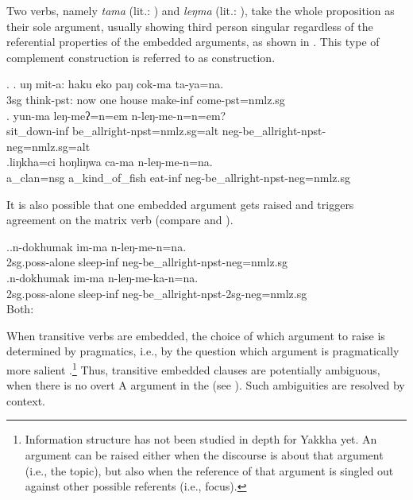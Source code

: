 Two verbs, namely \emph{tama}  (lit.: ) and \emph{leŋma}  (lit.: ), take the whole proposition as their sole argument, usually showing third person singular  regardless of the referential properties of the embedded arguments, as shown in \Next. This type of complement construction is referred to as  construction.

\ex. \ag. uŋ mit-a:       haku eko paŋ  cok-ma    ta-ya=na.\\
	{\sc 3sg} think{\sc [3sg]-pst}: now one house make-{\sc inf} come{\sc [3sg]-pst=nmlz.sg}\\
	 
 	\bg. yun-ma leŋ-meʔ=n=em n-leŋ-me-n=n=em?\\
	sit\_down{\sc -inf} be\_allright{\sc [3sg]-npst=nmlz.sg=alt} {\sc neg-}be\_allright{\sc [3sg]-npst-neg=nmlz.sg=alt}\\
	\bg.liŋkha=ci hoŋliŋwa ca-ma n-leŋ-me-n=na.\\
	a\_clan{\sc =nsg} a\_kind\_of\_fish eat{\sc -inf}	{\sc neg-}be\_allright{\sc [3sg]-npst-neg=nmlz.sg}\\ 

It is also possible that one embedded argument gets raised and triggers agreement on the matrix verb (compare \Next[a] and \Next[b]). 

\ex.\ag.n-dokhumak im-ma n-leŋ-me-n=na.\\
{\sc 2sg.poss-}alone sleep{\sc -inf} {\sc neg-}be\_allright{\sc [3sg]-npst-neg=nmlz.sg}\\
\bg.n-dokhumak im-ma n-leŋ-me-ka-n=na.\\
{\sc 2sg.poss-}alone sleep{\sc -inf} {\sc neg-}be\_allright{\sc -npst-2sg-neg=nmlz.sg}\\
Both: 


When transitive verbs are embedded, the choice of which argument to raise is determined by pragmatics, i.e., by the question which argument is pragmatically more salient \Next.\footnote{Information structure has not been studied in depth for Yakkha yet. An argument can be raised either when the discourse is about that argument (i.e., the topic), but also when the reference of that argument is singled out against other possible referents (i.e., focus).} Thus, transitive embedded clauses are potentially  ambiguous, when there is no overt A argument in the  (see \Next[b]). Such ambiguities are resolved by context.

